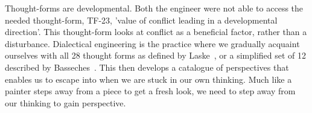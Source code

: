 Thought-forms are developmental.
Both the engineer were not able to access the needed thought-form, TF-23, 'value of conflict leading in a
developmental direction'.
This thought-form looks at conflict as a beneficial factor, rather than a disturbance.
Dialectical engineering is the practice where we gradually acquaint ourselves with all 28 thought forms as defined by
Laske~\citep{laske_2023_4_moments}, or a simplified set of 12 described by Basseches~\citep{shannon_metathinking}.
This then develops a catalogue of perspectives that enables us to escape into when we are stuck in our own thinking.
Much like a painter steps away from a piece to get a fresh look, we need to step away from our thinking to gain
perspective.